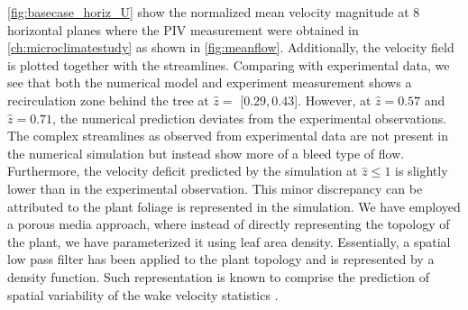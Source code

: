 \cref{fig:basecase_horiz_U} show the normalized mean velocity magnitude at 8 horizontal planes where the PIV measurement were obtained in \cref{ch:microclimatestudy} as shown in \cref{fig:meanflow}. Additionally, the velocity field is plotted together with the streamlines. Comparing with experimental data, we see that both the numerical model and experiment measurement shows a recirculation zone behind the tree at $\hat{z}=$ [$0.29$,\,$0.43$]. However, at $\hat{z}= 0.57$ and $\hat{z}=0.71$, the numerical prediction deviates from the experimental observations. The complex streamlines as observed from experimental data are not present in the numerical simulation but instead show more of a bleed type of flow. Furthermore, the velocity deficit predicted by the simulation at $\hat{z}\le 1$ is slightly lower than in the experimental observation. This minor discrepancy can be attributed to the plant foliage is represented in the simulation. We have employed a porous media approach, where instead of directly representing the topology of the plant, we have parameterized it using leaf area density. Essentially, a spatial low pass filter has been applied to the plant topology and is represented by a density function. Such representation is known to comprise the prediction of spatial variability of the wake velocity statistics \citep{Endalew2009}.  

%
%

